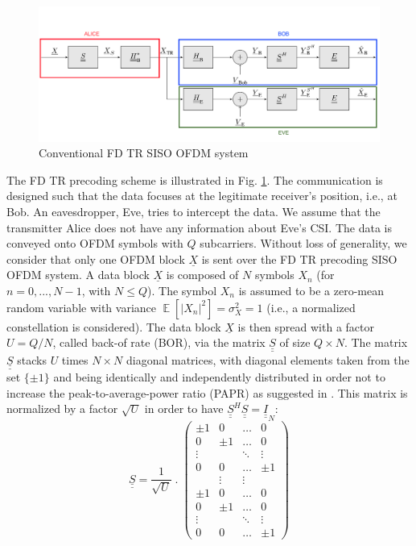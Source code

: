 \documentclass[a4paper,11pt]{article}
\def\uu#1{\underline{\underline{#1}}}
\begin{document}
\begin{figure}[t]
    \centering
    \centerline{\includegraphics[width = .53\textwidth]{img/scheme_no_AN.png}}
    \caption{Conventional FD TR SISO OFDM system}
    \label{fig:TR_FD_classical}
\end{figure}
The FD TR precoding scheme is illustrated in Fig. \ref{fig:TR_FD_classical}.  The communication is designed such that the data focuses at the legitimate receiver's position, i.e., at Bob. An eavesdropper, Eve, tries to intercept the data. We assume that the transmitter Alice does not have any information about Eve's CSI. The data is conveyed onto OFDM symbols with $Q$ subcarriers. Without loss of generality, we consider that only one OFDM block $\underline{X}$ is sent over the FD TR precoding SISO OFDM system. A data block $\underline{X}$ is composed of $N$ symbols $X_n$ (for $n = 0,..., N-1$, with $N\leq Q$). The symbol $X_n$ is assumed to be a zero-mean random variable with variance $\mathop{\mathbb{E}}\left[\left|X_n \right|^2\right] = \sigma_X^2 = 1$ (i.e., a normalized constellation is considered). The data block $\underline{X}$ is then spread with a factor $U = Q/N$, called back-of rate (BOR), via the matrix $\uu{S}$ of size $Q\times N$. The matrix $\uu{S}$ stacks $U$ times $N\times N$ diagonal matrices, with diagonal elements taken from the set $\{\pm1\}$ and being identically and independently distributed in order not to increase the peak-to-average-power ratio (PAPR) as suggested in \cite{papr}. 
This matrix is normalized by a factor $\sqrt{U}$ in order to have $\uu{S}^H \uu{S} = \uu{I}_N$:
\begin{equation}
\underline{\underline{S}} = \frac{1}{\sqrt{U}} \; . \;
   \begin{pmatrix}
    \pm 1 & 0 & \hdots & 0 \\
    0 & \pm 1 & \hdots & 0 \\
    \vdots & & \ddots & \vdots \\
    0 & 0 & \hdots & \pm 1 \\
     & \vdots& \vdots& \\
    \pm 1 & 0 & \hdots & 0 \\
    0 & \pm 1 & \hdots & 0 \\
    \vdots & & \ddots & \vdots \\
    0 & 0 & \hdots & \pm 1
 \end{pmatrix}
 \label{eq:spread_mat}
\end{equation}
\end{document}
